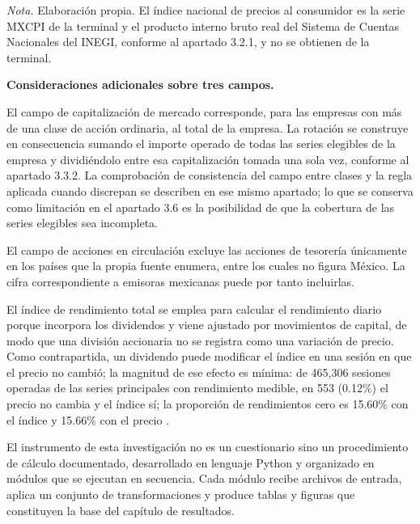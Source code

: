 \emph{Nota.} Elaboración propia. El índice nacional de precios al consumidor es la serie MXCPI de la terminal  y el producto interno bruto real del Sistema de Cuentas Nacionales del INEGI, conforme al apartado 3.2.1, y no se obtienen de la terminal.

\textbf{Consideraciones adicionales sobre tres campos.}

El campo de capitalización de mercado corresponde, para las empresas con más de una clase de acción ordinaria, al total de la empresa. La rotación se construye en consecuencia sumando el importe operado de todas las series elegibles de la empresa y dividiéndolo entre esa capitalización tomada una sola vez, conforme al apartado 3.3.2. La comprobación de consistencia del campo entre clases y la regla aplicada cuando discrepan se describen en ese mismo apartado; lo que se conserva como limitación en el apartado 3.6 es la posibilidad de que la cobertura de las series elegibles sea incompleta.

El campo de acciones en circulación excluye las acciones de tesorería únicamente en los países que la propia fuente enumera, entre los cuales no figura México. La cifra correspondiente a emisoras mexicanas puede por tanto incluirlas.

El índice de rendimiento total se emplea para calcular el rendimiento diario porque incorpora los dividendos y viene ajustado por movimientos de capital, de modo que una división accionaria no se registra como una variación de precio. Como contrapartida, un dividendo puede modificar el índice en una sesión en que el precio no cambió; la magnitud de ese efecto es mínima: de 465,306 sesiones operadas de las series principales con rendimiento medible, en 553 (0.12\%) el precio no cambia y el índice sí; la proporción de rendimientos cero es 15.60\% con el índice y 15.66\% con el precio .


El instrumento de esta investigación no es un cuestionario sino un procedimiento de cálculo documentado, desarrollado en lenguaje Python y organizado en módulos que se ejecutan en secuencia. Cada módulo recibe archivos de entrada, aplica un conjunto de transformaciones y produce tablas y figuras que constituyen la base del capítulo de resultados.

